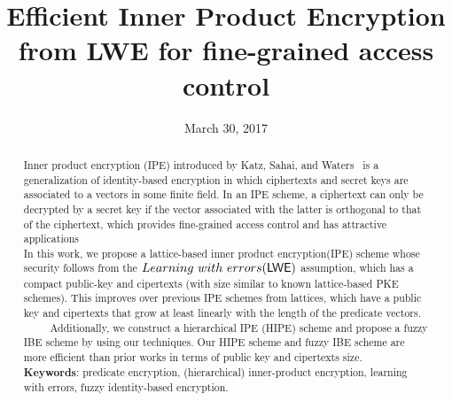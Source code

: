 \documentclass{llncs}
\begin{document}
\title{Efficient Inner Product Encryption from LWE for fine-grained access control}%

\author{}


\date{March 30, 2017}
\maketitle

\begin{abstract}
Inner product encryption (IPE) introduced by Katz, Sahai, and Waters~\cite{EC:KatSahWat08} is a generalization of identity-based encryption in which ciphertexts and secret keys are associated to a vectors in some finite field. In an IPE scheme, a ciphertext can only be decrypted by a secret key if the vector associated with the latter is orthogonal to that of the ciphertext, which provides fine-grained access control and has attractive applications\\
In this work, we propose a lattice-based inner product encryption(IPE) scheme whose security follows from the $Learning~with~errors (\mathsf{LWE})$ assumption, which has a compact public-key and cipertexts (with size similar to known lattice-based PKE schemes). This improves over previous IPE schemes from lattices, which have a public key and cipertexts that grow at least linearly with the length of the predicate vectors.\\
~~~~~Additionally, we construct a hierarchical IPE (HIPE) scheme and propose a fuzzy IBE scheme by using our techniques. Our HIPE scheme and fuzzy IBE scheme are more efficient than prior works in terms of public key and cipertexts size.\\
\textbf{Keywords}: predicate encryption, (hierarchical) inner-product encryption, learning with errors, fuzzy identity-based encryption.
\end{abstract}
















\end{document}
